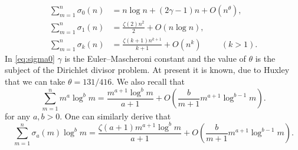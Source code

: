 \documentclass{article}
\theoremstyle{plain}
\theoremstyle{definition}
\begin{document}
\begin{align}
    \sum_{m=1}^n \sigma_0(n) &= n \log n + (2\gamma -1)n + O(n^\theta) \label{eq:sigma0}, \\ 
    \sum_{m=1}^n \sigma_1(n) &= \frac{\zeta(2)n^2}{2} + O(n\log n), \label{eq:sigma1}\\
    \sum_{m=1}^n \sigma_k(n) &= \frac{\zeta(k+1)n^{k+1}}{k+1} + O(n^k) \hspace{1cm} (k>1). \label{eq:sigmak}
\end{align}
In \eqref{eq:sigma0} $\gamma$ is the Euler–Mascheroni constant and the value of $\theta$ is the subject of the Dirichlet divisor problem.    At present it is known, due to Huxley \cite{Huxley} that we can take $\theta=131/416$.  We also recall that \begin{equation}
    \sum_{m=1}^n m^a \log^b m = \frac{m^{a+1} \log^b m}{a+1} + O\left(\frac{b}{m+1} m^{a+1}\log^{b-1} m \right). \label{eq:logsum}
\end{equation}
for any $a,b>0$. One can similarly derive that \begin{equation}
    \sum_{m=1}^n \sigma_a(m) \log^b m = \frac{\zeta(a+1)m^{a+1} \log^b m}{a+1} + O\left(\frac{b}{m+1} m^{a+1}\log^{b-1}m \right). \label{eq:sigmalogsum}
\end{equation}
\end{document}
